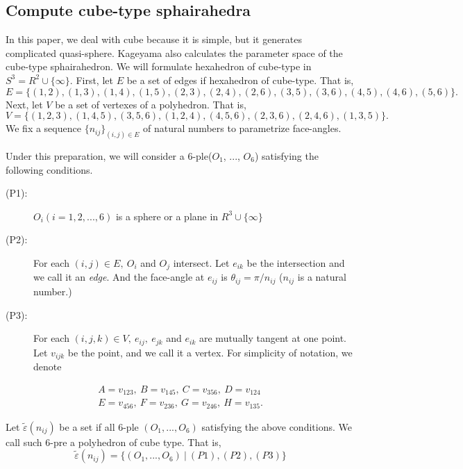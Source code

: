 \documentclass[suppldata, dvipdfmx]{interact}
\theoremstyle{plain}%
\theoremstyle{definition}
\theoremstyle{remark}
\theoremstyle{problemstyle}
\begin{document}

\subsection{Compute cube-type sphairahedra}
In this paper, we deal with cube because it is simple, but it generates
complicated quasi-sphere.
Kageyama also calculates the parameter space of the cube-type
sphairahedron\cite{kageyama}.
We will formulate hexahedron of cube-type in $S^3 = R^2 \cup \{\infty\}$.
First, let $E$ be a set of edges if hexahedron of cube-type. That is,
$$
E = \{(1, 2), (1, 3), (1, 4), (1, 5), (2, 3), (2, 4), (2, 6), (3, 5),
(3, 6), (4, 5), (4, 6), (5, 6)\}.
$$
Next, let $V$ be a set of vertexes of a polyhedron. That is,
$$
V = \{(1, 2, 3), (1, 4, 5), (3, 5, 6), (1, 2, 4), (4, 5, 6), (2, 3, 6),
(2, 4, 6), (1, 3, 5)\}.
$$
We fix a sequence $\{n_{ij}\}_{(i,j) \in E}$ of natural numbers to
parametrize face-angles.

Under this preparation, we will consider a 6-ple($O_1$, ..., $O_6$)
satisfying the following conditions.

\begin{description}
 \item[(P1):] $O_i(i = 1, 2, ..., 6)$ is a sphere or a plane in $R^3
            \cup \{\infty\}$
 \item[(P2):] For each $(i, j) \in E,~O_i$ and $O_j$ intersect. Let
            $e_{ik}$ be the intersection and we call it an
            \textit{edge}. And the face-angle at $e_{ij}$ is
            $\theta_{ij} = \pi/n_{ij}$ ($n_{ij}$ is a natural number.)
 \item[(P3):] For each $(i, j, k) \in V,~e_{ij},~e_{jk}$ and $e_{ik}$
            are mutually tangent at one point. Let $v_{ijk}$ be 
            the point, and we call it a vertex. For simplicity of
            notation, we denote
\end{description}
\begin{eqnarray*}
A = v_{123},~B=v_{145},~C = v_{356},~D = v_{124}\\
E = v_{456},~F=v_{236},~G = v_{246},~H = v_{135}.
\end{eqnarray*}

Let $\tilde\varepsilon(n_{ij})$ be a set if all 6-ple $(O_1, ..., O_6)$
satisfying the above conditions. We call such 6-pre a polyhedron of
cube type. That is,
$$
\tilde\varepsilon(n_{ij}) = \{(O_1, ..., O_6)~|~(P1), (P2), (P3)\}
$$
\end{document}
